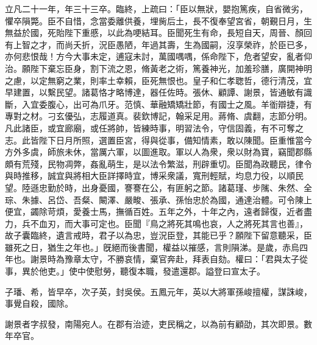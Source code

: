 \begin{pinyinscope}
 
立凡二十一年，年三十三卒。臨終，上疏曰：「臣以無狀，嬰抱篤疾，自省微劣，懼卒隕斃。臣不自惜，念當委離供養，埋胔后土，長不復奉望宮省，朝覲日月，生無益於國，死貽陛下重慼，以此為哽結耳。臣聞死生有命，長短自天，周晉、顏回有上智之才，而尚夭折，況臣愚陋，年過其壽，生為國嗣，沒享榮祚，於臣已多，亦何悲恨哉！方今大事未定，逋寇未討，萬國喁喁，係命陛下，危者望安，亂者仰治。願陛下棄忘臣身，割下流之恩，脩黃老之術，篤養神光，加羞珍膳，廣開神明之慮，以定無窮之業，則率土幸賴，臣死無恨也。皇子和仁孝聦哲，德行清茂，宜早建置，以繫民望。諸葛恪才略博達，器任佐時。張休、顧譚、謝景，皆通敏有識斷，入宜委腹心，出可為爪牙。范慎、華融矯矯壯節，有國士之風。羊衜辯捷，有專對之材。刁玄優弘，志履道真。裴欽博記，翰采足用。蔣脩、虞翻，志節分明。凡此諸臣，或宜廊廟，或任將帥，皆練時事，明習法令，守信固義，有不可奪之志。此皆陛下日月所照，選置臣宮，得與從事，備知情素，敢以陳聞。臣重惟當今方外多虞，師旅未休，當厲六軍，以圖進取。軍以人為衆，衆以財為寶，竊聞郡縣頗有荒殘，民物凋弊，姦亂萌生，是以法令繁滋，刑辟重切。臣聞為政聽民，律令與時推移，誠宜與將相大臣詳擇時宜，博采衆議，寬刑輕賦，均息力役，以順民望。陸遜忠勤於時，出身憂國，謇謇在公，有匪躬之節。諸葛瑾、步隲、朱然、全琮、朱據、呂岱、吾粲、闞澤、嚴畯、張承、孫怡忠於為國，通達治體。可令陳上便宜，蠲除苛煩，愛養士馬，撫循百姓。五年之外，十年之內，遠者歸復，近者盡力，兵不血刃，而大事可定也。臣聞『鳥之將死其鳴也哀，人之將死其言也善』，故子囊臨終，遺言戒時，君子以為忠，豈況臣登，其能已乎？願陛下留意聽采，臣雖死之日，猶生之年也。」旣絕而後書聞，權益以摧感，言則隕涕。是歲，赤烏四年也。謝景時為豫章太守，不勝哀情，棄官奔赴，拜表自劾。權曰：「君與太子從事，異於他吏。」使中使慰勞，聽復本職，發遣還郡。謚登曰宣太子。
 
 
子璠、希，皆早卒，次子英，封吳侯。五鳳元年，英以大將軍孫峻擅權，謀誅峻，事覺自殺，國除。
 
 
 
 
 謝景者字叔發，南陽宛人。在郡有治迹，吏民稱之，以為前有顧劭，其次即景。數年卒官。
 
 
\end{pinyinscope}